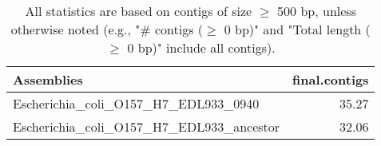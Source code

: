 \documentclass[12pt,a4paper]{article}
\begin{document}
\begin{table}[ht]
\begin{center}
\caption{All statistics are based on contigs of size $\geq$ 500 bp, unless otherwise noted (e.g., "\# contigs ($\geq$ 0 bp)" and "Total length ($\geq$ 0 bp)" include all contigs).}
\begin{tabular}{|l*{1}{|r}|}
\hline
Assemblies & final.contigs \\ \hline
Escherichia\_coli\_O157\_H7\_EDL933\_0940 & 35.27 \\ \hline
Escherichia\_coli\_O157\_H7\_EDL933\_ancestor & 32.06 \\ \hline
\end{tabular}
\end{center}
\end{table}
\end{document}
